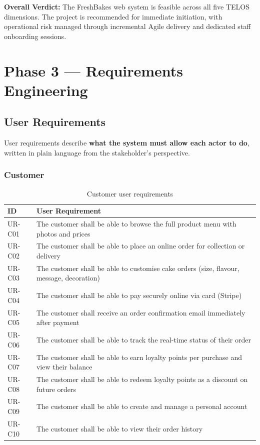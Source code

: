 \documentclass[12pt, a4paper]{report}
\begin{document}
\begin{verdictbox}
\textbf{Overall Verdict:} The FreshBakes web system is feasible across all
five TELOS dimensions. The project is recommended for immediate initiation,
with operational risk managed through incremental Agile delivery and dedicated
staff onboarding sessions.
\end{verdictbox}

\chapter{Phase 3 --- Requirements Engineering}

\section{User Requirements}

User requirements describe \textbf{what the system must allow each actor to
do}, written in plain language from the stakeholder's perspective.

\subsection{Customer}

\begin{table}[H]
  \centering
  \begin{tabularx}{\textwidth}{L{1.5cm} X}
    \toprule
    \textbf{ID} & \textbf{User Requirement} \\
    \midrule
    UR-C01 & The customer shall be able to browse the full product menu with photos and prices \\
    UR-C02 & The customer shall be able to place an online order for collection or delivery \\
    UR-C03 & The customer shall be able to customise cake orders (size, flavour, message, decoration) \\
    UR-C04 & The customer shall be able to pay securely online via card (Stripe) \\
    UR-C05 & The customer shall receive an order confirmation email immediately after payment \\
    UR-C06 & The customer shall be able to track the real-time status of their order \\
    UR-C07 & The customer shall be able to earn loyalty points per purchase and view their balance \\
    UR-C08 & The customer shall be able to redeem loyalty points as a discount on future orders \\
    UR-C09 & The customer shall be able to create and manage a personal account \\
    UR-C10 & The customer shall be able to view their order history \\
    \bottomrule
  \end{tabularx}
  \caption{Customer user requirements}
\end{table}
\end{document}
